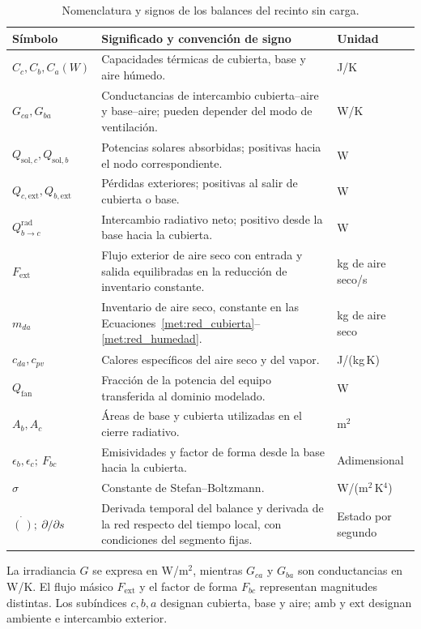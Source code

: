 \begin{table}[p]
\centering
\caption{Nomenclatura y signos de los balances del recinto sin carga.}
\label{met:tabla_pinn_balances}
\begingroup
\small
\setlength{\tabcolsep}{4pt}
\renewcommand{\arraystretch}{1.12}
\begin{tabularx}{\textwidth}{@{}>{\raggedright\arraybackslash}p{}>{\raggedright\arraybackslash}X>{\raggedright\arraybackslash}p{}@{}}
\toprule
Símbolo & Significado y convención de signo & Unidad \\
\midrule
$C_c,C_b,C_a(W)$ & Capacidades térmicas de cubierta, base y aire húmedo. & J/K \\
$G_{ca},G_{ba}$ & Conductancias de intercambio cubierta--aire y base--aire; pueden depender del modo de ventilación. & W/K \\
$Q_{\mathrm{sol},c},Q_{\mathrm{sol},b}$ & Potencias solares absorbidas; positivas hacia el nodo correspondiente. & W \\
$Q_{c,\mathrm{ext}},Q_{b,\mathrm{ext}}$ & Pérdidas exteriores; positivas al salir de cubierta o base. & W \\
$Q_{b\to c}^{\mathrm{rad}}$ & Intercambio radiativo neto; positivo desde la base hacia la cubierta. & W \\
$F_{\mathrm{ext}}$ & Flujo exterior de aire seco con entrada y salida equilibradas en la reducción de inventario constante. & kg de aire seco/s \\
$m_{da}$ & Inventario de aire seco, constante en las Ecuaciones~\ref{met:red_cubierta}--\ref{met:red_humedad}. & kg de aire seco \\
$c_{da},c_{pv}$ & Calores específicos del aire seco y del vapor. & J/(kg\,K) \\
$Q_{\mathrm{fan}}$ & Fracción de la potencia del equipo transferida al dominio modelado. & W \\
$A_b,A_c$ & Áreas de base y cubierta utilizadas en el cierre radiativo. & m$^2$ \\
$\epsilon_b,\epsilon_c;\ F_{bc}$ & Emisividades y factor de forma desde la base hacia la cubierta. & Adimensional \\
$\sigma$ & Constante de Stefan--Boltzmann. & W/(m$^2$\,K$^4$) \\
$\dot{(\,)};\ \partial/\partial s$ & Derivada temporal del balance y derivada de la red respecto del tiempo local, con condiciones del segmento fijas. & Estado por segundo \\
\bottomrule
\end{tabularx}
\endgroup
\par\smallskip
\begin{minipage}{\textwidth}\footnotesize
La irradiancia $G$ se expresa en W/m$^2$, mientras $G_{ca}$ y $G_{ba}$ son conductancias en W/K. El flujo másico $F_{\mathrm{ext}}$ y el factor de forma $F_{bc}$ representan magnitudes distintas. Los subíndices $c,b,a$ designan cubierta, base y aire; $\mathrm{amb}$ y $\mathrm{ext}$ designan ambiente e intercambio exterior.
\end{minipage}
\end{table}
